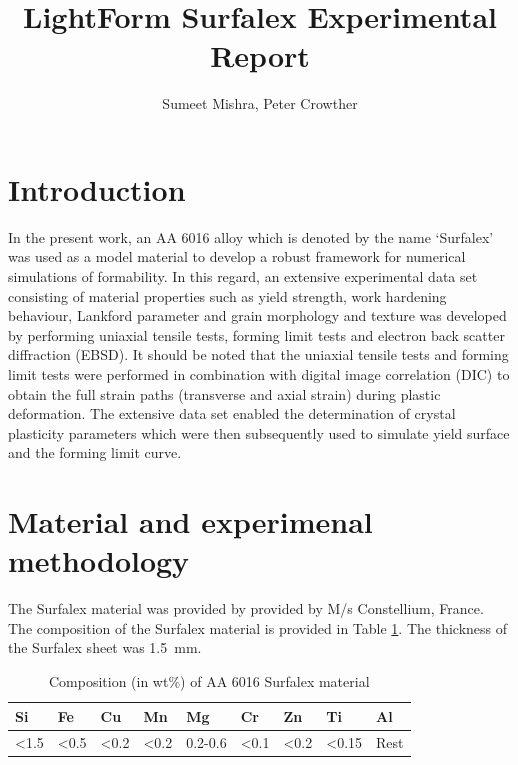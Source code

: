 \documentclass[11pt]{article} %
\title{LightForm Surfalex Experimental Report}
\author{Sumeet Mishra, Peter Crowther}
\date{} %
\begin{document}
\maketitle

\section{Introduction}
In the present work, an AA 6016 alloy which is denoted by the name ‘Surfalex’ was used as a model material to develop a robust framework for numerical simulations of formability. In this regard, an extensive experimental data set consisting of material properties such as yield strength, work hardening behaviour, Lankford parameter and grain morphology and texture was developed by performing uniaxial tensile tests, forming limit tests and electron back scatter diffraction (EBSD). It should be noted that the uniaxial tensile tests and forming limit tests were performed in combination with digital image correlation (DIC) to obtain the full strain paths (transverse and axial strain) during plastic deformation. The extensive data set enabled the determination of crystal plasticity parameters which were then subsequently used to simulate yield surface and the forming limit curve. 

\section{Material and experimenal methodology}
The Surfalex material was provided by provided by M/s Constellium, France. The composition of the Surfalex material is provided in Table \ref{tab:compositon}. The thickness of the Surfalex sheet was \SI{1.5}{\milli\meter}. 

\begin{table}[]
\begin{tabular}{|l|l|l|l|l|l|l|l|l|}
\hline
Si             & Fe             & Cu             & Mn             & Mg      & Cr             & Zn             & Ti              & Al   \\ \hline
\textless{}1.5 & \textless{}0.5 & \textless{}0.2 & \textless{}0.2 & 0.2-0.6 & \textless{}0.1 & \textless{}0.2 & \textless{}0.15 & Rest \\ \hline
\end{tabular}
\caption{Composition (in wt\%) of AA 6016 Surfalex material}
\label{tab:compositon}
\end{table}
\end{document}
